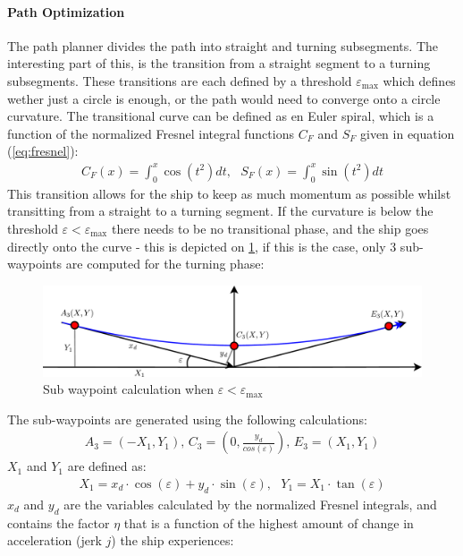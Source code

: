 \documentclass[a0,portrait]{a0poster}
\begin{document}
\begin{center}
{\paragraph{Path Optimization}
The path planner divides the path into straight and turning subsegments. The interesting part of this, is the transition from a straight segment to a turning subsegments. These transitions are each defined by a threshold $\varepsilon_\text{max}$ which defines wether just a circle is enough, or the path would need to converge onto a circle curvature. The transitional curve can be defined as en Euler spiral, which is a function of the normalized Fresnel integral functions $C_F$ and $S_F$ given in equation (\ref{eq:fresnel}):
\begin{align}
C_F(x) = \int_0^x \cos(t^2)dt,\,\,\,\,S_F(x) = \int_0^x \sin(t^2)dt
\label{eq:fresnel}
\end{align}
This transition allows for the ship to keep as much momentum as possible \cite{archibald} whilst transitting from a straight to a turning segment. If the curvature is below the threshold $\varepsilon < \varepsilon_\text{max}$ there needs to be no transitional phase, and the ship goes directly onto the curve - this is depicted on \ref{fig:3points}, if this is the case, only 3 sub-waypoints are computed for the turning phase:
\begin{figure}
	\centering %
	\includegraphics[width=\threecolwidth]{img/3points}
  	\caption{Sub waypoint calculation when $\varepsilon < \varepsilon_\text{max}$}
	\label{fig:3points}
\end{figure}
The sub-waypoints are generated using the following calculations:
\begin{align}
A_3 = (-X_1,Y_1),\, C_3 = (0,\frac{y_d}{cos(\varepsilon)}),\, E_3 = (X_1,Y_1)
\end{align}
$X_1$ and $Y_1$ are defined as:
\begin{align}
X_1 = x_d \cdot \cos(\varepsilon) + y_d \cdot \sin(\varepsilon),\,\,\,\, Y_1 = X_1 \cdot 	\tan(\varepsilon)
\end{align}
$x_d$ and $y_d$ are the variables calculated by the normalized Fresnel integrals, and contains the factor $\eta$ that is a function of the highest amount of change in acceleration (jerk $j$) the ship experiences:
}
\end{center}
\end{document}
